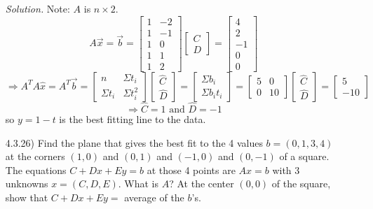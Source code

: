 \documentclass[12pt]{article}
\begin{document}
\begin{itemize}
\textit{Solution.} Note: $A$ is $n \times 2$. \[
A\vec{x}=\vec{b}=\left[\begin{array}{cr} 
1 & -2 \\
1 & -1 \\
1 &  0 \\
1 &  1 \\
1 &  2
\end{array}\right]
\left[\begin{array}{c}C \\ D \end{array}\right] = 
\left[\begin{array}{r} 
 4 \\
 2 \\
-1 \\
 0 \\
 0 
\end{array}\right]\]
\[\Rightarrow A^TA\hat{x}=A^T\vec{b} = 
\left[\begin{array}{cc} 
n & \Sigma t_i\\
\Sigma t_i & \Sigma t_i^2 
\end{array}\right] \left[\begin{array}{c}\hat{C} \\ \hat{D} \end{array}\right] =
\left[\begin{array}{c} \Sigma b_i \\ \Sigma b_it_i \end{array}\right] =
\left[\begin{array}{cc} 
5 & 0 \\
0 & 10 
\end{array}\right] \left[\begin{array}{c}\hat{C} \\ \hat{D} \end{array}\right] =
\left[\begin{array}{c} 5 \\ -10 \end{array}\right]
\]
\[
\Rightarrow \hat{C}=1 \text{ and } \hat{D}=-1
\] so $y=1-t$ is the best fitting line to the data.

\item[4.3.26)] Find the plane that gives the best fit to the 4 values $b=(0,1,3,4)$ at the corners $(1,0)$ and $(0,1)$ and $(-1,0)$ and $(0,-1)$ of a square. The equations $C+Dx+Ey=b$ at those 4 points are $Ax=b$ with 3 unknowns $x=(C,D,E)$. What is $A$? At the center $(0,0)$ of the square, show that $C+Dx+Ey=$ average of the $b$'s.


\end{itemize}
\end{document}
